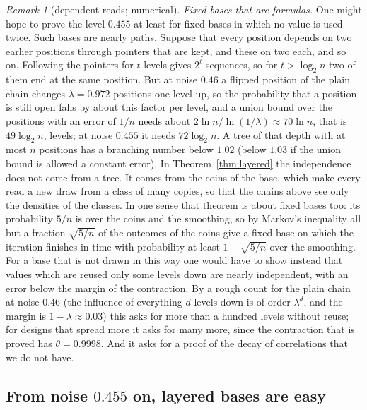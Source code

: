 \documentclass[11pt]{amsart}
\theoremstyle{definition}
\theoremstyle{remark}
\newtheorem{remark}[theorem]{Remark}
\begin{document}
\begin{remark}[dependent reads; numerical]
\emph{Fixed bases that are formulas.} One might hope to prove the level $0.455$ at least for
fixed bases in which no value is used twice. Such bases are nearly paths. Suppose that every
position depends on two earlier positions through pointers that are kept, and these on two each,
and so on. Following the pointers for $t$ levels gives $2^t$ sequences, so for $t>\log_2n$ two of
them end at the same position. But at noise $0.46$ a flipped position of the plain chain changes
$\lambda=0.972$ positions one level up, so the probability that a position is still open falls
by about this factor per level, and a union bound over the positions with an error of $1/n$
needs about $2\ln n/\ln(1/\lambda)\approx70\ln n$, that is $49\log_2n$, levels; at noise $0.455$
it needs $72\log_2n$. A tree of that depth with at most $n$ positions has a branching number
below $1.02$ (below $1.03$ if the union bound is allowed a constant error). In
Theorem~\ref{thm:layered} the
independence does not come from a tree. It comes from the coins of the base, which make every
read a new draw from a class of many copies, so that the chains above see only the densities of
the classes. In one sense that theorem is about fixed bases too: its probability $5/n$ is over
the coins and the smoothing, so by Markov's inequality all but a fraction $\sqrt{5/n}$ of the
outcomes of the coins give a fixed base on which the iteration finishes in time with probability
at least $1-\sqrt{5/n}$ over the smoothing. For a base that is not drawn in this way one would
have to show instead that values which are reused only some levels down are nearly independent,
with an error below the margin of the contraction. By a rough count for the plain chain at noise
$0.46$ (the influence of everything $d$ levels down is of order $\lambda^d$, and the margin is
$1-\lambda\approx0.03$) this asks for more than a hundred levels without reuse; for designs that
spread more it asks for many more, since the contraction that is proved has
$\theta=0.9998$. And it asks for a proof of the decay of correlations that we do not have.
\end{remark}

\subsection{From noise \texorpdfstring{$0.455$}{0.455} on, layered bases are easy}\label{sec:layered}
\end{document}
